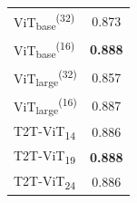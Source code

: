 \begin{table}[!h]
\begin{subtable}{.48\textwidth}
\begin{tabularx}{\textwidth}{Xc}
			\hline
			ViT\textsubscript{base}\textsuperscript{(32)}  & 0.873 \\
			ViT\textsubscript{base}\textsuperscript{(16)} &  \textbf{0.888}   \\
			ViT\textsubscript{large}\textsuperscript{(32)} &  0.857\\
			ViT\textsubscript{large}\textsuperscript{(16)} &   0.887 \\
			T2T-ViT\textsubscript{14} & 0.886 \\
			T2T-ViT\textsubscript{19} &  \textbf{0.888} \\
			T2T-ViT\textsubscript{24} & 0.886 \\
			\hline
		\end{tabularx}
	\end{subtable} 
\end{table}

